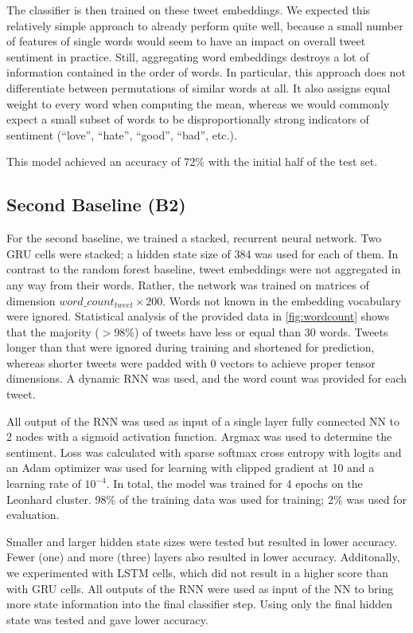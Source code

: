 \documentclass[10pt,conference,compsocconf]{IEEEtran}
\begin{document}
The classifier is then trained on these tweet embeddings. We expected
this relatively simple approach to already perform quite well, because
a small number of features of single words would seem to have an
impact on overall tweet sentiment in practice. Still, aggregating word
embeddings destroys a lot of information contained in the order of
words. In particular, this approach does not differentiate between
permutations of similar words at all. It also assigns equal weight to
every word when computing the mean, whereas we would commonly expect a
small subset of words to be disproportionally strong indicators of
sentiment (``love'', ``hate'', ``good'', ``bad'', etc.).

This model achieved an accuracy of 72\% with the initial half of the test set.

\subsection{Second Baseline (B2)} \label{subsec:b2}

For the second baseline, we trained a stacked, recurrent neural
network. Two GRU cells were stacked; a hidden state size of 384 was used for each of them.
In contrast to the random forest baseline, tweet embeddings
were not aggregated in any way from their words. Rather, the network
was trained on matrices of dimension \(word\_count_{tweet} \times 200\).
Words not known in the embedding vocabulary were ignored.
Statistical analysis of the provided data in \autoref{fig:wordcount} shows that
the majority ($>$98\%) of tweets have less or equal than 30 words.
Tweets longer than that were ignored during training and shortened for prediction,
whereas shorter tweets were padded with 0 vectors to achieve proper tensor dimensions.
A dynamic RNN was used, and the word count was provided for each tweet.

All output of the RNN was used as input of a single layer fully connected NN
to 2 nodes with a sigmoid activation function.
Argmax was used to determine the sentiment.
Loss was calculated with sparse softmax cross entropy with logits and
an Adam optimizer was used for learning with clipped gradient at 10
and a learning rate of $10^{-4}$.
In total, the model was trained for 4 epochs on the Leonhard cluster.
98\% of the training data was used for training; 2\% was used for evaluation.

Smaller and larger hidden state sizes were tested but resulted in
lower accuracy. Fewer (one) and more (three) layers also resulted in lower accuracy.
Additonally, we experimented with LSTM cells, which did not result in
a higher score than with GRU cells.
All outputs of the RNN were used as input of the NN to bring more state
information into the final classifier step. Using only the final hidden
state was tested and gave lower accuracy.
\end{document}
